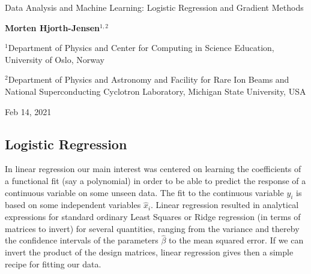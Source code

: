 \documentclass[%
oneside,                 %
final,                   %
10pt]{article}
\begin{document}

\newcommand{\exercisesection}[1]{\subsection*{#1}}






\thispagestyle{empty}

\begin{center}
{\LARGE\bf
\begin{spacing}{1.25}
Data Analysis and Machine Learning: Logistic Regression and Gradient Methods
\end{spacing}
}
\end{center}


\begin{center}
{\bf Morten Hjorth-Jensen${}^{1, 2}$} \\ [0mm]
\end{center}

\begin{center}
\centerline{{\small ${}^1$Department of Physics and Center for Computing in Science Education, University of Oslo, Norway}}
\centerline{{\small ${}^2$Department of Physics and Astronomy and Facility for Rare Ion Beams and National Superconducting Cyclotron Laboratory, Michigan State University, USA}}
\end{center}
    

\begin{center}
Feb 14, 2021
\end{center}

\vspace{1cm}


\subsection*{Logistic Regression}

In linear regression our main interest was centered on learning the
coefficients of a functional fit (say a polynomial) in order to be
able to predict the response of a continuous variable on some unseen
data. The fit to the continuous variable $y_i$ is based on some
independent variables $\hat{x}_i$. Linear regression resulted in
analytical expressions for standard ordinary Least Squares or Ridge
regression (in terms of matrices to invert) for several quantities,
ranging from the variance and thereby the confidence intervals of the
parameters $\hat{\beta}$ to the mean squared error. If we can invert
the product of the design matrices, linear regression gives then a
simple recipe for fitting our data.
\end{document}
